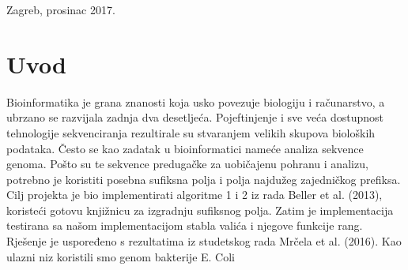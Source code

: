 \documentclass[11pt]{article}
\begin{document}
\begin{titlepage}
	
	\vfill\vfill\vfill\vfill %
	
	{\large Zagreb, prosinac 2017.} %
	
	
	 
	
	
\end{titlepage}

\newpage

\tableofcontents
\newpage

\section{Uvod}

Bioinformatika je grana znanosti koja usko povezuje biologiju i računarstvo, a ubrzano se razvijala zadnja dva desetljeća. Pojeftinjenje i sve veća dostupnost tehnologije sekvenciranja rezultirale su stvaranjem velikih skupova bioloških podataka. Često se kao zadatak u bioinformatici nameće analiza sekvence genoma.
Pošto su te sekvence predugačke za uobičajenu pohranu i analizu, potrebno je koristiti posebna sufiksna polja i polja najdužeg zajedničkog prefiksa. Cilj projekta je bio implementirati algoritme 1 i 2 iz rada Beller et al. (2013), koristeći gotovu knjižnicu za izgradnju sufiksnog polja. 
Zatim je implementacija testirana sa našom implementacijom stabla valića i njegove funkcije rang. Rješenje je uspoređeno s rezultatima iz studetskog rada Mrčela et al. (2016). Kao ulazni niz koristili smo genom bakterije E. Coli

\newpage
\end{document}
